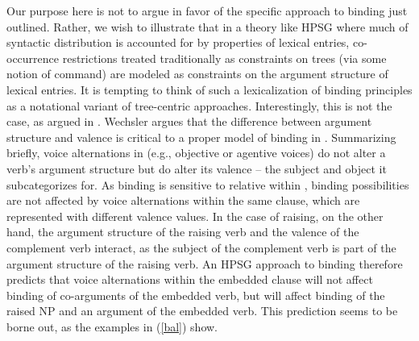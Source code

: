 \documentclass[output=paper,biblatex,babelshorthands,newtxmath,draftmode,colorlinks,citecolor=brown]{langscibook}
\begin{document}
\largerpage
\noindent
Our purpose here is not to argue in favor of the specific approach to binding just outlined. Rather,
we wish to illustrate that in a theory like HPSG where much of syntactic distribution is accounted
for by properties of lexical entries, co-occurrence restrictions treated traditionally as
constraints on trees (via some notion of command) are modeled as constraints on the argument
structure of lexical entries. It is tempting to think of such a lexicalization of binding principles
as a notational variant of tree-centric approaches. Interestingly, this is not the case, as argued
in . Wechsler argues that the difference between argument structure and valence
is critical to a proper model of binding in . Summarizing briefly, voice alternations
in  (e.g., objective or agentive voices)
do not alter a verb's argument structure but do alter its valence -- the subject and object it
subcategorizes for. As binding is sensitive to relative  within , binding possibilities are not affected by voice alternations within the same clause, which are represented with different valence values. In the case of raising, on the other hand, the argument structure of the raising verb and the valence of the complement verb interact, as the subject of the complement verb is part of the argument structure of the raising verb. An HPSG approach to binding therefore predicts that voice alternations within the embedded clause will not affect binding of co-arguments of the embedded verb, but will affect binding of the raised NP and an argument of the embedded verb. This prediction seems to be borne out, as the  examples in (\ref{bal}) show. 
\end{document}
